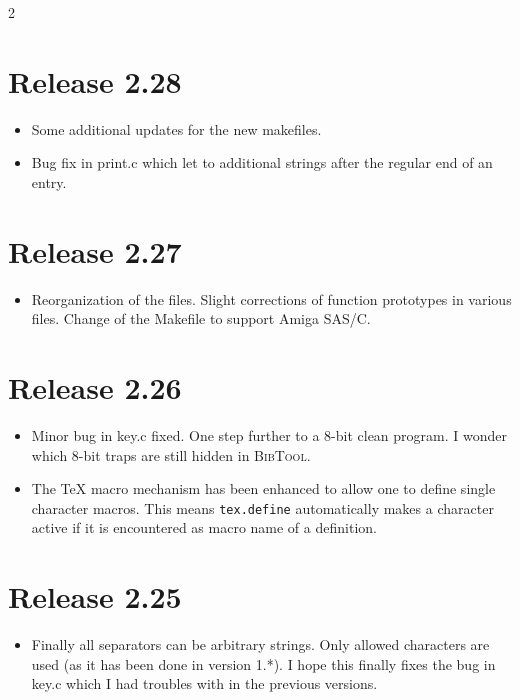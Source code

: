 \documentclass[11pt,a4paper]{scrartcl}
\newcommand\rsc[1]{\texttt{#1}}
\newcommand\File[1]{\textsf{#1}}
\newcommand\BibTool{\textsc{BibTool}}
\newenvironment{Releases}{\begin{multicols}2\RaggedRight}{\end{multicols}}
\newenvironment{Release}[2]{%
  \def\tmp{#2}%
  \section*{Release #1 \ifx\tmp\empty\else{\normalsize[#2]}\fi}
  \begin{itemize}
}{\end{itemize}}
\newenvironment{Fix}[1]{\item }{}
\newenvironment{Update}[1]{\item }{}
\begin{document}
\begin{Releases}
 \begin{Release}{2.28}{}
  \begin{Update}{gene}
    Some additional updates for the new makefiles.
  \end{Update}
  \begin{Fix}{gene}
    Bug fix in \File{print.c} which let to additional strings after the
    regular end of an entry.
  \end{Fix}
 \end{Release}

 \begin{Release}{2.27}{}
  \begin{Update}{gene}
    Reorganization of the files. Slight corrections of function
    prototypes in various files. Change of the \File{Makefile} to
    support Amiga SAS/C.
  \end{Update}
 \end{Release}

 \begin{Release}{2.26}{}
  \begin{Fix}{gene}
    Minor bug in \File{key.c} fixed. One step further to a 8-bit clean
    program. I wonder which 8-bit traps are still hidden in \BibTool.
  \end{Fix}
  \begin{Update}{gene}
    The \TeX{} macro mechanism has been enhanced to allow one to define
    single character macros. This means \rsc{tex.define}
    automatically makes a character active if it is encountered as
    macro name of a definition.
  \end{Update}
 \end{Release}

 \begin{Release}{2.25}{}
  \begin{Update}{gene}
    Finally all separators can be arbitrary strings. Only allowed
    characters are used (as it has been done in version 1.*). I hope
    this finally fixes the bug in key.c which I had troubles with in
    the previous versions.
  \end{Update}
 \end{Release}


\end{Releases}
\end{document}
